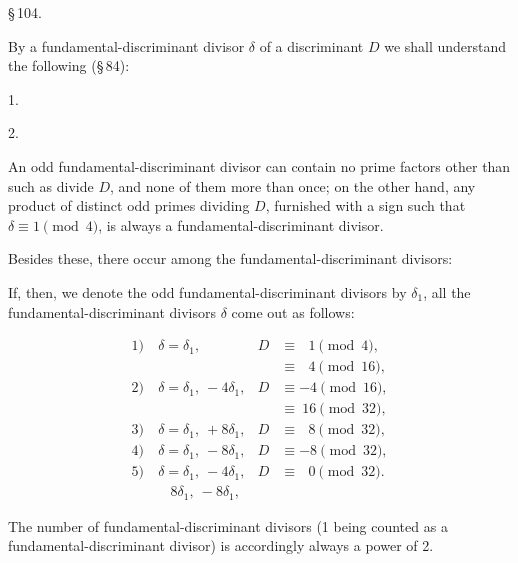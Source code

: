 \S\,104. 

By a fundamental-discriminant divisor $\delta$ of a discriminant $D$ we shall understand
the following (\S\,84):

1. 

2. 

An odd fundamental-discriminant divisor can contain no prime factors other than
such as divide $D$, and none of them more than once; on the other
hand, any product of distinct odd primes dividing $D$, furnished
with a sign such that $\delta \equiv 1 \pmod{4}$, is always a fundamental-discriminant divisor.

Besides these, there occur among the fundamental-discriminant divisors:


If, then, we denote the odd fundamental-discriminant divisors by $\delta_1$, all the
fundamental-discriminant divisors $\delta$ come out as follows:

\[
\begin{aligned}
1)\ & \delta = \delta_1, & D &\equiv\ \ \ 1 \pmod{4}, \\
& & &\equiv\ \ \ 4 \pmod{16}, \\
2)\ & \delta = \delta_1,\ -4\delta_1, & D &\equiv -4 \pmod{16}, \\
& & &\equiv\ 16 \pmod{32}, \\
3)\ & \delta = \delta_1,\ +8\delta_1, & D &\equiv\ \ \ 8 \pmod{32}, \\
4)\ & \delta = \delta_1,\ -8\delta_1, & D &\equiv -8 \pmod{32}, \\
5)\ & \delta = \delta_1,\ -4\delta_1, & D &\equiv\ \ \ 0 \pmod{32}. \\
& \ \ \ \ 8\delta_1,\ -8\delta_1, & &
\end{aligned}
\]

The number of fundamental-discriminant divisors (1 being counted as a fundamental-discriminant divisor)
is accordingly always a power of 2.

